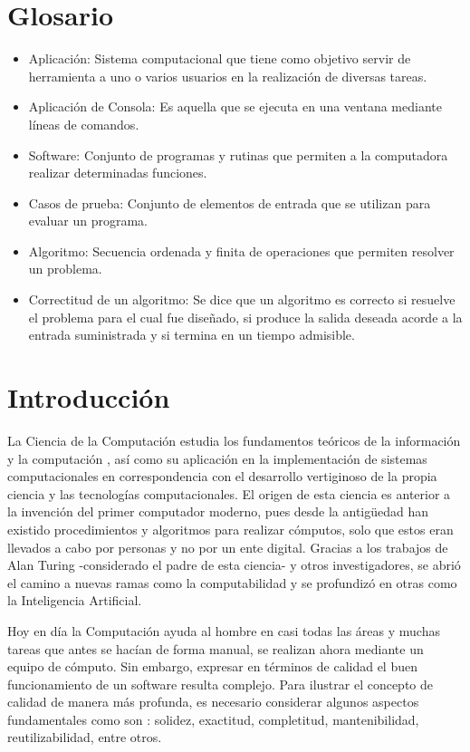 \documentclass[a4paper,12pt]{book}
\begin{document}
\chapter*{Glosario}
	\begin{itemize}
		\item Aplicación: Sistema computacional que tiene como objetivo servir de herramienta a uno o varios usuarios en la realización de diversas tareas.
		\item Aplicación de Consola: Es aquella que se ejecuta en una ventana mediante líneas de comandos.
		\item Software: Conjunto de programas y rutinas que permiten a la computadora realizar determinadas funciones.
		\item Casos de prueba: Conjunto de elementos de entrada que se utilizan para evaluar un programa.
		\item Algoritmo: Secuencia ordenada y finita de operaciones que permiten resolver un problema.
		\item Correctitud de un algoritmo: Se dice que un algoritmo es correcto si resuelve el problema para el cual fue diseñado, si produce la salida deseada acorde a la entrada suministrada y si termina en un tiempo admisible.
	\end{itemize}
	
\chapter{Introducción}

	La Ciencia de la Computación estudia los fundamentos teóricos de la información y la computación \cite{montero2017computacion}, así como su aplicación en la implementación de sistemas computacionales en correspondencia con el desarrollo vertiginoso de la propia ciencia y las tecnologías computacionales. El origen de esta ciencia es anterior a la invención del primer computador moderno, pues desde la antigüedad han existido procedimientos y algoritmos para realizar cómputos, solo que estos eran llevados a cabo por personas y no por un ente digital. Gracias a los trabajos de Alan Turing \cite{Turing} -considerado el padre de esta ciencia- y otros investigadores, se abrió el camino a nuevas ramas como la computabilidad y se profundizó en otras como la Inteligencia Artificial.
	
	Hoy en día la Computación ayuda al hombre en casi todas las áreas y muchas tareas que antes se hacían de forma manual, se realizan ahora mediante un equipo de cómputo. Sin embargo, expresar en términos de calidad el buen funcionamiento de un software \cite{lopez2016definicion} resulta complejo. Para ilustrar el concepto de calidad de manera más profunda, es necesario considerar algunos aspectos fundamentales como son : solidez, exactitud, completitud, mantenibilidad, reutilizabilidad, entre otros.
	
\end{document}
